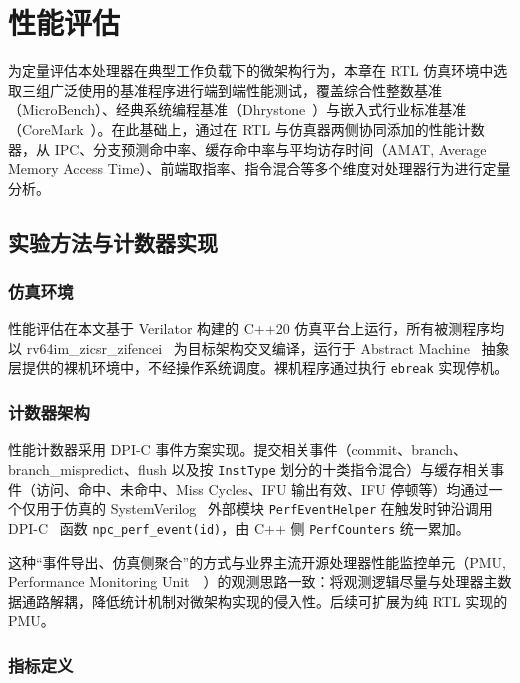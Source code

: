 
\chapter{性能评估}

为定量评估本处理器在典型工作负载下的微架构行为，本章在 RTL 仿真环境中选取三组广泛使用的基准程序进行端到端性能测试，覆盖综合性整数基准（MicroBench）、经典系统编程基准（Dhrystone~\cite{weicker1984dhrystone}）与嵌入式行业标准基准（CoreMark~\cite{coremark2009}）。在此基础上，通过在 RTL 与仿真器两侧协同添加的性能计数器，从 IPC、分支预测命中率、缓存命中率与平均访存时间（AMAT, Average Memory Access Time）、前端取指率、指令混合等多个维度对处理器行为进行定量分析。

\section{实验方法与计数器实现}

\subsection{仿真环境}

性能评估在本文基于 Verilator 构建的 C++20 仿真平台上运行，所有被测程序均以 rv64im\_zicsr\_zifencei~\cite{riscv2024unpriv} 为目标架构交叉编译，运行于 Abstract Machine~\cite{nju_abstract_machine} 抽象层提供的裸机环境中，不经操作系统调度。裸机程序通过执行 \lstinline|ebreak| 实现停机。

\subsection{计数器架构}

性能计数器采用 DPI-C 事件方案实现。提交相关事件（commit、branch、branch\_mispredict、flush 以及按 \lstinline|InstType| 划分的十类指令混合）与缓存相关事件（访问、命中、未命中、Miss Cycles、IFU 输出有效、IFU 停顿等）均通过一个仅用于仿真的 SystemVerilog~\cite{ieee2017systemverilog} 外部模块 \lstinline|PerfEventHelper| 在触发时钟沿调用 DPI-C~\cite{ieee2017systemverilog} 函数 \lstinline|npc_perf_event(id)|，由 C++ 侧 \lstinline|PerfCounters| 统一累加。

这种“事件导出、仿真侧聚合”的方式与业界主流开源处理器性能监控单元（PMU, Performance Monitoring Unit~\cite{arm2024armArm}~\cite{wang2023xiangshan}）的观测思路一致：将观测逻辑尽量与处理器主数据通路解耦，降低统计机制对微架构实现的侵入性。后续可扩展为纯 RTL 实现的 PMU。

\subsection{指标定义}

